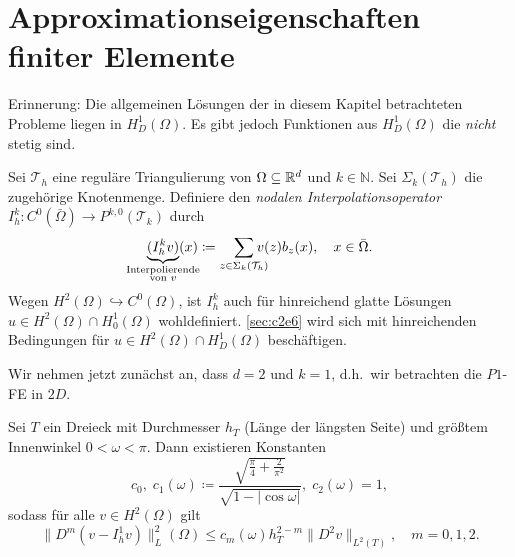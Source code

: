 \documentclass[../skript.tex]{subfiles}
\begin{document}
\section{Approximationseigenschaften finiter Elemente}\label{sec:c2e5}
Erinnerung: Die allgemeinen Lösungen der in diesem Kapitel betrachteten Probleme liegen in $H^1_D(\Omega)$. Es gibt jedoch Funktionen aus $H^1_D(\Omega)$ die \emph{nicht} stetig sind.
\begin{definition}\label{def:c2e5s1}
	Sei $\mathcal{T}_h$ eine reguläre Triangulierung von $\Omega\subseteq\mathbb{R}^d$ und $k\in\mathbb{N}$. Sei $\Sigma_k(\mathcal{T}_h)$ die zugehörige Knotenmenge. Definiere den \emph{nodalen Interpolationsoperator} $I_h^k:C^0(\bar{\Omega})\to P^{k,0}(\mathcal{T}_k)$ durch 
	\[
		\underbrace{(I_h^k v)}_{\mathclap{\substack{\text{Interpolierende} \\ \text{von } v}}}(x) \coloneqq \sum_{z\in \Sigma_k(\mathcal{T}_h)} \hspace*{-10pt} v(z)b_z(x),\quad x\in\bar{\Omega}.
	\]  
	Wegen $H^2(\Omega)\hookrightarrow C^0(\Omega)$, ist $I_h^k$ auch für hinreichend glatte Lösungen $u\in H^2(\Omega)\cap H^1_0(\Omega)$ wohldefiniert. \cref{sec:c2e6} wird sich mit hinreichenden Bedingungen für $u\in H^2(\Omega)\cap H^1_D(\Omega)$ beschäftigen.
\end{definition}
Wir nehmen jetzt zunächst an, dass $d=2$ und $k=1$, d.h.\ wir betrachten die $P1$-FE in $2D$.
\begin{theorem}[Interpolationsfehlerabschätzung]\label{thm:c2e5s2}
	Sei $T$ ein Dreieck mit Durchmesser $h_T$ (Länge der längsten Seite) und größtem Innenwinkel $0 < \omega < \pi$. Dann existieren Konstanten 
	\[
		c_0,\;c_1(\omega)\coloneqq\frac{\sqrt{\frac{\pi}{4}+\frac{2}{\pi^2}}}{\sqrt{1-|\cos{\omega}|}},\; c_2(\omega) = 1,
	\]
	sodass für alle $v\in H^2(\Omega)$ gilt
	\[
		\| D^m(v-I_h^1 v)\|_L^2(\Omega) \leq c_m(\omega)h_T^{2-m}\| D^2 v\|_{L^2(T)},\quad m=0,1,2.
	\]
\end{theorem}
\end{document}
